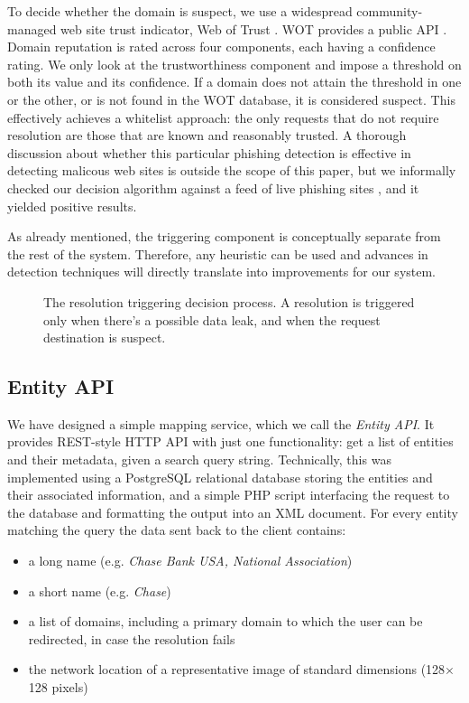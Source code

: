 \documentclass[11pt,styles/chicago]{article}
\begin{document}
To decide whether the domain is suspect, we use a widespread community-managed web site trust indicator, Web of Trust \cite{wot}. WOT provides a public API \cite{wotapi}. Domain reputation is rated across four components, each having a confidence rating. We only look at the trustworthiness component and impose a threshold on both its value and its confidence. If a domain does not attain the threshold in one or the other, or is not found in the WOT database, it is considered suspect. This effectively achieves a whitelist approach: the only requests that do not require resolution are those that are known and reasonably trusted. A thorough discussion about whether this particular phishing detection is effective in detecting malicous web sites is outside the scope of this paper, but we informally checked our decision algorithm against a feed of live phishing sites \cite{phishtank}, and it yielded positive results.

As already mentioned, the triggering component is conceptually separate from the rest of the system. Therefore, any heuristic can be used and advances in detection techniques will directly translate into improvements for our system.

\begin{figure}[t]
  \caption{The resolution triggering decision process. A resolution is triggered only when there's a possible data leak, and when the request destination is suspect.}
  \label{fig:decisiondgrm}
\end{figure}

\subsection{Entity API}

We have designed a simple mapping service, which we call the \emph{Entity API}. It provides REST-style HTTP API with just one functionality: get a list of entities and their metadata, given a search query string. Technically, this was implemented using a PostgreSQL relational database storing the entities and their associated information, and a simple PHP script interfacing the request to the database and formatting the output into an XML document. For every entity matching the query the data sent back to the client contains:

\begin{itemize}
\item a long name (e.g. \emph{Chase Bank USA, National Association})
\item a short name (e.g. \emph{Chase})
\item a list of domains, including a primary domain to which the user can be redirected, in case the resolution fails
\item the network location of a representative image of standard dimensions (128$\times$128 pixels)
\end{itemize}
\end{document}
